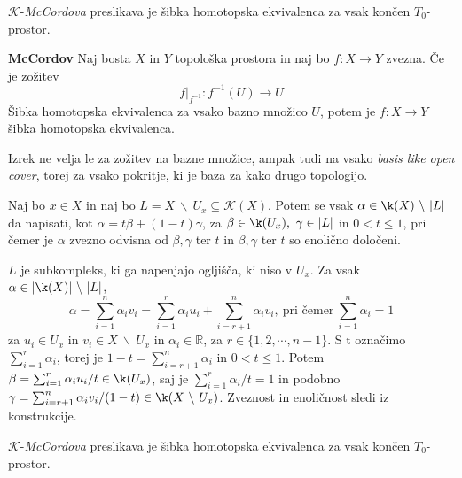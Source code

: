 \begin{izrek}
    $\mathcal{K}$-\textit{McCordova} preslikava je šibka homotopska 
    ekvivalenca za vsak končen $T_0$-prostor.
\end{izrek}


\begin{izrek}{\textbf{McCordov}}\label{iz:mccord}
    Naj bosta $X$ in $Y$ topološka prostora in naj bo $f:X\rightarrow Y$ zvezna. Če je zožitev
    $$
    f|_{f^{-1}}:f^{-1}(U)\rightarrow U
    $$
    Šibka homotopska ekvivalenca za vsako bazno množico $U$, potem je $f:X\rightarrow Y$  šibka homotopska ekvivalenca.
\end{izrek}

\begin{opomba}
    Izrek ne velja le za zožitev na bazne množice, ampak tudi na vsako \textit{basis like open cover}, torej za vsako pokritje, ki je baza za kako drugo topologijo.
\end{opomba}



\begin{lema}\label{lem:sibka}
    Naj bo $x\in X$ in naj bo $L=X\ \backslash \
    U_x\subseteq \mathcal{K}(X)$. Potem se vsak $\alpha \in \k(X)\ \backslash \ |L|$ da napisati, kot $\alpha = t\beta + (1-t)\gamma$, za $\beta \in \k(U_x), \ \gamma \in |L|$ in $0<t\leq 1$, pri čemer je $\alpha$ zvezno odvisna od $\beta, \gamma$ ter $t$ in $\beta, \gamma$ ter $t$ so enolično določeni.
\end{lema}
\begin{dokaz}
    $L$ je subkompleks, ki ga napenjajo ogljišča, ki niso v $U_x$. Za vsak $\alpha \in |\k(X)|\ \backslash \ |L|$, 
    $$\alpha = \sum_{i=1}^{n} \alpha_i v_i 
    = \sum_{i=1}^{r} \alpha_i u_i + \sum_{i=r+1}^{n}\alpha_i v_i,\ \text{pri čemer}\ \sum_{i=1}^{n} \alpha_i=1
    $$
    za $u_i \in U_x$ in $v_i \in X \ \backslash \ U_x$ in $\alpha_i \in \mathbb{R}$, za $r\in \{1,2, \cdots, n-1\}$. S t označimo $\sum_{i=1}^{r} \alpha_i$, torej je $1-t=\sum_{i=r+1}^{n} \alpha_i$ in $0<t\leq 1$. Potem $\beta =\sum_{i=1}^{r} \alpha_i u_i/t \in \k(U_x)$, saj je $\sum_{i=1}^{r} \alpha_i/t=1$ in podobno $\gamma=\sum_{i=r+1}^{n} 
    \alpha_i v_i/(1-t) \in \k(X \ \backslash \ U_x)$. Zveznost in enoličnost sledi iz konstrukcije.

\end{dokaz}

\begin{izrek}
    $\mathcal{K}$-\textit{McCordova} preslikava je šibka homotopska 
    ekvivalenca za vsak končen $T_0$-prostor.
\end{izrek}

